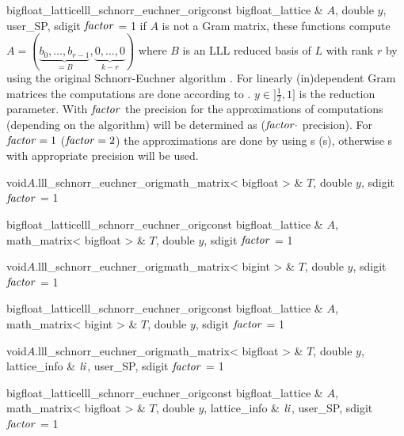\begin{fcode}{bigfloat_lattice}{lll_schnorr_euchner_orig}{const bigfloat_lattice & $A$,
    double $y$, user_SP, sdigit $\mathit{factor}$ = 1}%
  if $A$ is not a Gram matrix, these functions compute $A = (\underbrace{b_0, \dots,
    b_{r-1}}_{=B},\underbrace{0, \dots, 0}_{k-r})$ where $B$ is an LLL reduced basis of $L$ with
  rank $r$ by using the original Schnorr-Euchner algorithm \cite{Schnorr/Euchner:1994}.  For
  linearly (in)dependent Gram matrices the computations are done according to \cite{Cohen:1995}.
  $y\in ]\frac{1}{2},1]$ is the reduction parameter.  With $\mathit{factor}$ the precision for the
  approximations of computations (depending on the algorithm) will be determined as ($\mathit{factor}
  \cdot$  precision).  For $\mathit{factor} = 1$ ($\mathit{factor} = 2$) the approximations are
  done by using s (s), otherwise s with appropriate
  precision will be used.
\end{fcode}

\begin{fcode}{void}{$A$.lll_schnorr_euchner_orig}{math_matrix< bigfloat > & $T$, double $y$,
    sdigit $\mathit{factor}$ = 1}%
\end{fcode}

\begin{fcode}{bigfloat_lattice}{lll_schnorr_euchner_orig}{const bigfloat_lattice & $A$,
    math_matrix< bigfloat > & $T$, double $y$, sdigit $\mathit{factor}$ = 1}%
\end{fcode}

\begin{fcode}{void}{$A$.lll_schnorr_euchner_orig}{math_matrix< bigint > & $T$, double $y$,
    sdigit $\mathit{factor}$ = 1}%
\end{fcode}

\begin{fcode}{bigfloat_lattice}{lll_schnorr_euchner_orig}{const bigfloat_lattice & $A$,
    math_matrix< bigint > & $T$, double $y$, sdigit $\mathit{factor}$ = 1}%
\end{fcode}

\begin{fcode}{void}{$A$.lll_schnorr_euchner_orig}{math_matrix< bigfloat > & $T$, double $y$,
    lattice_info & $\mathit{li}$, user_SP, sdigit $\mathit{factor}$ = 1}%
\end{fcode}

\begin{fcode}{bigfloat_lattice}{lll_schnorr_euchner_orig}{const bigfloat_lattice & $A$,
    math_matrix< bigfloat > & $T$, double $y$, lattice_info & $\mathit{li}$, user_SP, sdigit $\mathit{factor}$ = 1}%
\end{fcode}

